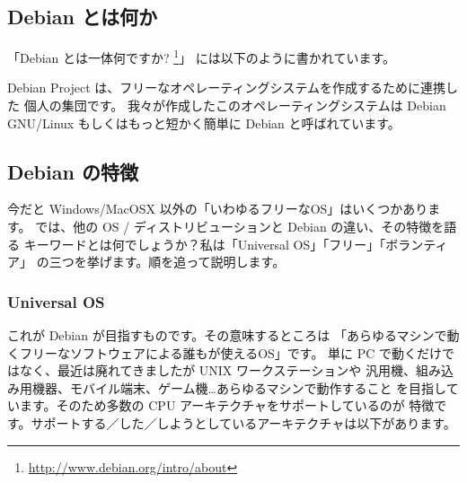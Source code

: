 \documentclass[mingoth,a4paper]{jsarticle}
\begin{document}
\subsection{Debian とは何か}
「Debian とは一体何ですか? \footnote{\url{http://www.debian.org/intro/about}}」
には以下のように書かれています。

\begin{description}
\item \small Debian Project は、フリーなオペレーティングシステムを作成するために連携した
個人の集団です。 我々が作成したこのオペレーティングシステムは Debian GNU/Linux 
もしくはもっと短かく簡単に Debian と呼ばれています。
\end{description}

\subsection{Debian の特徴}
今だと Windows/MacOSX 以外の「いわゆるフリーなOS」はいくつかあります。
では、他の OS / ディストリビューションと Debian の違い、その特徴を語る
キーワードとは何でしょうか？私は「Universal OS」「フリー」「ボランティア」
の三つを挙げます。順を追って説明します。

\subsubsection{Universal OS}
これが Debian が目指すものです。その意味するところは
「あらゆるマシンで動くフリーなソフトウェアによる誰もが使えるOS」です。
単に PC で動くだけではなく、最近は廃れてきましたが UNIX ワークステーションや
汎用機、組み込み用機器、モバイル端末、ゲーム機…あらゆるマシンで動作すること
を目指しています。そのため多数の CPU アーキテクチャをサポートしているのが
特徴です。サポートする／した／しようとしているアーキテクチャは以下があります。
\end{document}
